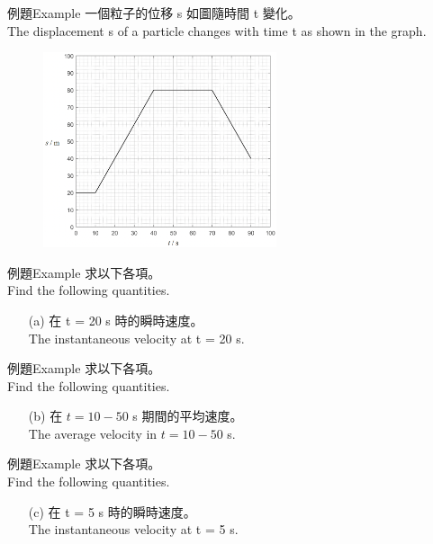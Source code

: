 \documentclass[beamer=true]{standalone}
\begin{document}
\begin{frame}[t]{例題Example}
    一個粒子的位移 s 如圖隨時間 t 變化。 \\The displacement s of a particle changes with time t as shown in the graph.
    \begin{figure}[h!]
        \centering
        \includegraphics[width=0.61\textwidth]{../../assets/07c55dd0.png}
    \end{figure}
\end{frame}
\begin{frame}[t]{例題Example}
    求以下各項。 \\Find the following quantities.
    \begin{itemize}
        \item [(a)]在 t = 20 s 時的瞬時速度。 \\The instantaneous velocity at t = 20 s.
    \end{itemize}
\end{frame}
\begin{frame}[t]{例題Example}
    求以下各項。 \\Find the following quantities.
    \begin{itemize}
        \item [(b)]在 $t = 10-50 $ \unit{s} 期間的平均速度。 \\The average velocity in $t = 10-50 $ \unit{s}.
    \end{itemize}
\end{frame}
\begin{frame}[t]{例題Example}
    求以下各項。 \\Find the following quantities.
    \begin{itemize}
        \item [(c)]在 t = 5 s 時的瞬時速度。 \\The instantaneous velocity at t = 5 s.
    \end{itemize}
\end{frame}
\end{document}
